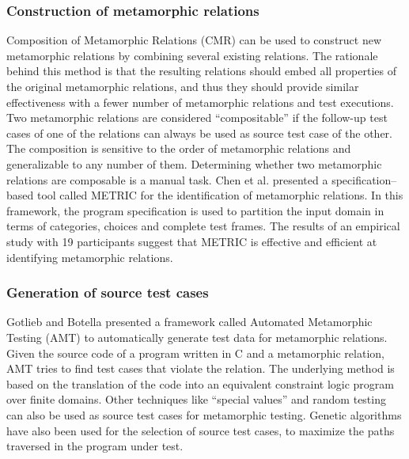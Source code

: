 		\subsubsection{Construction of metamorphic relations}
		Composition of Metamorphic Relations (CMR) can be used to construct new metamorphic relations by combining several existing relations. The rationale behind this method is that the resulting relations should embed all properties of the original metamorphic relations, and thus they should provide similar effectiveness with a fewer number of metamorphic relations and test executions. Two metamorphic relations are considered “compositable” if the follow-up test cases of one of the relations can always be used as source test case of the other. The composition is sensitive to the order of metamorphic relations and generalizable to any number of them. Determining whether two metamorphic relations are composable is a manual task. Chen et al. \cite{Chen2016} presented a specification–based tool called METRIC for the identification of metamorphic relations. In this framework, the program specification is used to partition the input domain in terms of categories, choices and complete test frames. The results of an empirical study with 19 participants suggest that METRIC is effective and efficient at identifying metamorphic relations.

		\subsubsection{Generation of source test cases}
		Gotlieb and Botella \cite{Gotlieb2003} presented a framework called Automated Metamorphic Testing (AMT) to automatically generate test data for metamorphic relations. Given the source code of a program written in C and a metamorphic relation, AMT tries to find test cases that violate the relation. The underlying method is based on the translation of the code into an equivalent constraint logic program over finite domains. Other techniques like “special values” and random testing can also be used as source test cases for metamorphic testing. Genetic algorithms have also been used for the selection of source test cases, to maximize the paths traversed in the program under test.


